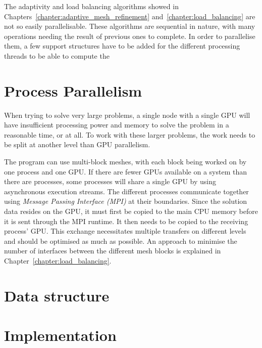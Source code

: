 The adaptivity and load balancing algorithms showed in
Chapters~\ref{chapter:adaptive_mesh_refinement} and~\ref{chapter:load_balancing} are not so easily
parallelisable. These algorithms are sequential in nature, with many operations needing the result
of previous ones to complete. In order to parallelise them, a few support structures have to be
added for the different processing threads to be able to compute the

\section{Process Parallelism} \label{section:graphics_processing_units:process_parallelism}

When trying to solve very large problems, a single node with a single GPU will have insufficient
processing power and memory to solve the problem in a reasonable time, or at all. To work with these
larger problems, the work needs to be split at another level than GPU parallelism.  

The program can use multi-block meshes, with each block being worked on by one process and one GPU.
If there are fewer GPUs available on a system than there are processes, some processes will share a
single GPU by using asynchronous execution streams. The different processes communicate together
using \textit{Message Passing Interface (MPI)} at their boundaries. Since the solution data resides
on the GPU, it must first be copied to the main CPU memory before it is sent through the MPI
runtime. It then needs to be copied to the receiving process' GPU. This exchange necessitates
multiple transfers on different levels and should be optimised as much as possible. An approach to
minimise the number of interfaces between the different mesh blocks is explained in
Chapter~\ref{chapter:load_balancing}. 

\section{Data structure} \label{section:graphics_processing_units:data_structure}

\section{Implementation} \label{section:graphics_processing_units:implementation}
